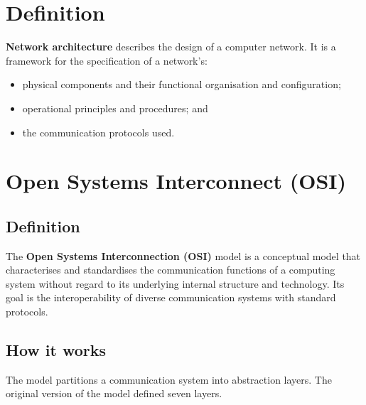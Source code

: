 \documentclass[a4paper]{systems-software}
\begin{document}
\section*{Definition}

\textbf{Network architecture} describes the design of a computer network. It is a framework for the specification of a network's:
\begin{itemize}
	\item physical components and their functional organisation and configuration;
	\item operational principles and procedures; and
	\item the communication protocols used.
\end{itemize}


\section*{Open Systems Interconnect (OSI)}

\subsection*{Definition}

The \textbf{Open Systems Interconnection (OSI)} model is a conceptual model that characterises and standardises the communication functions of a computing system without regard to its underlying internal structure and technology. Its goal is the interoperability of diverse communication systems with standard protocols.

\subsection*{How it works}

The model partitions a communication system into abstraction layers. The original version of the model defined seven layers.
\end{document}
